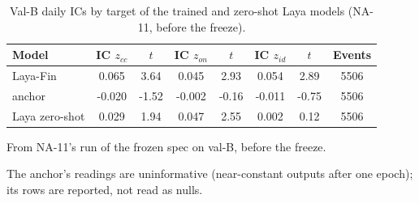 \begin{table}[htbp]
\centering
\small
\begin{threeparttable}
\caption{Val-B daily ICs by target of the trained and zero-shot Laya models (NA-11, before the freeze).}\label{tab:a-val-b-ic}
\begin{tabular}{@{}lS[table-format=-1.3]S[table-format=-1.2]S[table-format=-1.3]S[table-format=-1.2]S[table-format=-1.3]S[table-format=-1.2]S[table-format=4.0]@{}}
\toprule
Model & {IC $z_{cc}$} & {$t$} & {IC $z_{on}$} & {$t$} & {IC $z_{id}$} & {$t$} & {Events} \\
\midrule
Laya-Fin & 0.065 & 3.64 & 0.045 & 2.93 & 0.054 & 2.89 & 5506 \\
anchor & -0.020 & -1.52 & -0.002 & -0.16 & -0.011 & -0.75 & 5506 \\
Laya zero-shot & 0.029 & 1.94 & 0.047 & 2.55 & 0.002 & 0.12 & 5506 \\
\bottomrule
\end{tabular}
\begin{tablenotes}[flushleft]\footnotesize
\item From NA-11's run of the frozen spec on val-B, before the freeze.
\item The anchor's readings are uninformative (near-constant outputs after one epoch); its rows are reported, not read as nulls.
\end{tablenotes}
\end{threeparttable}
\end{table}
